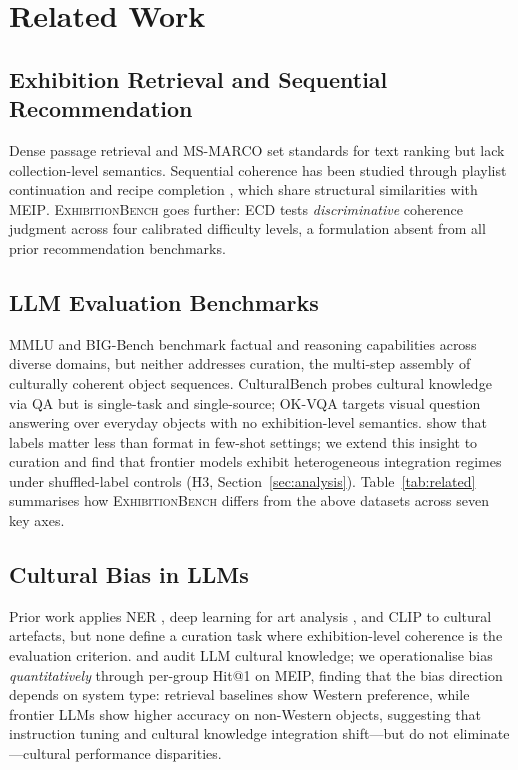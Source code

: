 \documentclass[11pt]{article}
\newcommand{\bench}{\textsc{ExhibitionBench}}
\newcommand{\meip}{\textsc{MEIP}}
\newcommand{\ecd}{\textsc{ECD}}
\begin{document}


\section{Related Work}
\label{sec:related}

\subsection{Exhibition Retrieval and Sequential Recommendation}

Dense passage retrieval \citep{karpukhin2020dpr} and MS-MARCO
\citep{nguyen2016msmarco} set standards for text ranking but lack
collection-level semantics.
Sequential coherence has been studied through playlist continuation
\citep{schedl2022music} and recipe completion \citep{bosselut2018simulating},
which share structural similarities with \meip{}.
\bench{} goes further: \ecd{} tests \emph{discriminative} coherence
judgment across four calibrated difficulty levels,
a formulation absent from all prior recommendation benchmarks.

\subsection{LLM Evaluation Benchmarks}

MMLU \citep{hendrycks2020mmlu} and BIG-Bench \citep{srivastava2022bigbench}
benchmark factual and reasoning capabilities across diverse domains,
but neither addresses curation, the multi-step assembly of culturally
coherent object sequences.
CulturalBench \citep{culturalbench2024} probes cultural knowledge via QA
but is single-task and single-source;
OK-VQA \citep{schwartz2022okvqa} targets visual question answering over
everyday objects with no exhibition-level semantics.
\citet{min2022rethinking} show that labels matter less than format in
few-shot settings; we extend this insight to curation and find that
frontier models exhibit heterogeneous integration regimes under
shuffled-label controls (H3, Section~\ref{sec:analysis}).
Table~\ref{tab:related} summarises how \bench{} differs from the above
datasets across seven key axes.


\subsection{Cultural Bias in LLMs}

Prior work applies NER \citep{broscheit2010named}, deep learning for art analysis
\citep{cetinic2019deep}, and CLIP \citep{radford2021clip} to cultural
artefacts, but none define a curation task where exhibition-level coherence
is the evaluation criterion.
\citet{cao-etal-2023-assessing} and \citet{adilazuarda-etal-2024-towards}
audit LLM cultural knowledge; we operationalise bias \emph{quantitatively}
through per-group Hit@1 on MEIP, finding that the bias direction
depends on system type: retrieval baselines show Western preference,
while frontier LLMs show higher accuracy on non-Western objects,
suggesting that instruction tuning and cultural knowledge integration
shift---but do not eliminate---cultural performance disparities.
\end{document}
